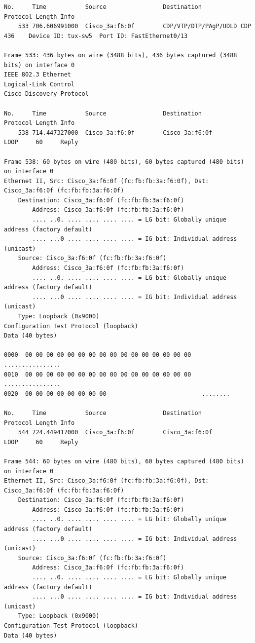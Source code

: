 \documentclass[a4paper,11pt]{article}
\begin{document}
\begin{lstlisting}
No.     Time           Source                Destination           Protocol Length Info
    533 706.606991000  Cisco_3a:f6:0f        CDP/VTP/DTP/PAgP/UDLD CDP      436    Device ID: tux-sw5  Port ID: FastEthernet0/13  

Frame 533: 436 bytes on wire (3488 bits), 436 bytes captured (3488 bits) on interface 0
IEEE 802.3 Ethernet 
Logical-Link Control
Cisco Discovery Protocol

No.     Time           Source                Destination           Protocol Length Info
    538 714.447327000  Cisco_3a:f6:0f        Cisco_3a:f6:0f        LOOP     60     Reply

Frame 538: 60 bytes on wire (480 bits), 60 bytes captured (480 bits) on interface 0
Ethernet II, Src: Cisco_3a:f6:0f (fc:fb:fb:3a:f6:0f), Dst: Cisco_3a:f6:0f (fc:fb:fb:3a:f6:0f)
    Destination: Cisco_3a:f6:0f (fc:fb:fb:3a:f6:0f)
        Address: Cisco_3a:f6:0f (fc:fb:fb:3a:f6:0f)
        .... ..0. .... .... .... .... = LG bit: Globally unique address (factory default)
        .... ...0 .... .... .... .... = IG bit: Individual address (unicast)
    Source: Cisco_3a:f6:0f (fc:fb:fb:3a:f6:0f)
        Address: Cisco_3a:f6:0f (fc:fb:fb:3a:f6:0f)
        .... ..0. .... .... .... .... = LG bit: Globally unique address (factory default)
        .... ...0 .... .... .... .... = IG bit: Individual address (unicast)
    Type: Loopback (0x9000)
Configuration Test Protocol (loopback)
Data (40 bytes)

0000  00 00 00 00 00 00 00 00 00 00 00 00 00 00 00 00   ................
0010  00 00 00 00 00 00 00 00 00 00 00 00 00 00 00 00   ................
0020  00 00 00 00 00 00 00 00                           ........

No.     Time           Source                Destination           Protocol Length Info
    544 724.449417000  Cisco_3a:f6:0f        Cisco_3a:f6:0f        LOOP     60     Reply

Frame 544: 60 bytes on wire (480 bits), 60 bytes captured (480 bits) on interface 0
Ethernet II, Src: Cisco_3a:f6:0f (fc:fb:fb:3a:f6:0f), Dst: Cisco_3a:f6:0f (fc:fb:fb:3a:f6:0f)
    Destination: Cisco_3a:f6:0f (fc:fb:fb:3a:f6:0f)
        Address: Cisco_3a:f6:0f (fc:fb:fb:3a:f6:0f)
        .... ..0. .... .... .... .... = LG bit: Globally unique address (factory default)
        .... ...0 .... .... .... .... = IG bit: Individual address (unicast)
    Source: Cisco_3a:f6:0f (fc:fb:fb:3a:f6:0f)
        Address: Cisco_3a:f6:0f (fc:fb:fb:3a:f6:0f)
        .... ..0. .... .... .... .... = LG bit: Globally unique address (factory default)
        .... ...0 .... .... .... .... = IG bit: Individual address (unicast)
    Type: Loopback (0x9000)
Configuration Test Protocol (loopback)
Data (40 bytes)


\end{lstlisting}
\end{document}
